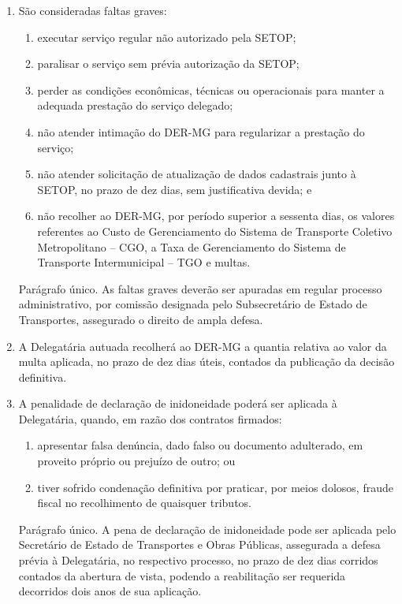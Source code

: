 \begin{enumerate}[resume, label=Art. \arabic*]
\item São consideradas faltas graves:

\begin{enumerate}[label=\roman*.]

\item executar serviço regular não autorizado pela SETOP;

\item paralisar o serviço sem prévia autorização da SETOP;

\item perder as condições econômicas, técnicas ou operacionais para manter a adequada prestação do serviço delegado;

\item não atender intimação do DER-MG para regularizar a prestação do serviço;

\item não atender solicitação de atualização de dados cadastrais junto à SETOP, no prazo de dez dias, sem justificativa devida; e

\item não recolher ao DER-MG, por período superior a sessenta dias, os valores referentes ao Custo de Gerenciamento do Sistema de Transporte Coletivo Metropolitano – CGO, a Taxa de Gerenciamento do Sistema de Transporte Intermunicipal – TGO e multas.

\end{enumerate}

Parágrafo único. As faltas graves deverão ser apuradas em regular processo administrativo, por comissão designada pelo Subsecretário de Estado de Transportes, assegurado o direito de ampla defesa.

\item A Delegatária autuada recolherá ao DER-MG a quantia relativa ao valor da multa aplicada, no prazo de dez dias úteis, contados da publicação da decisão definitiva.

\item A penalidade de declaração de inidoneidade poderá ser aplicada à Delegatária, quando, em razão dos contratos firmados:

\begin{enumerate}[label=\roman*.]

\item apresentar falsa denúncia, dado falso ou documento adulterado, em proveito próprio ou prejuízo de outro; ou

\item tiver sofrido condenação definitiva por praticar, por meios dolosos, fraude fiscal no recolhimento de quaisquer tributos.

\end{enumerate}

Parágrafo único. A pena de declaração de inidoneidade pode ser aplicada pelo Secretário de Estado de Transportes e Obras Públicas, assegurada a defesa prévia à Delegatária, no respectivo processo, no prazo de dez dias corridos contados da abertura de vista, podendo a reabilitação ser requerida decorridos dois anos de sua aplicação.

\end{enumerate}


